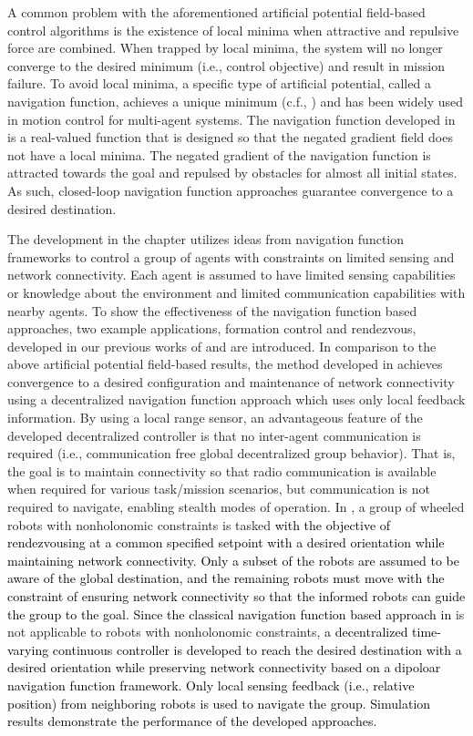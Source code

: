 \documentclass[english]{IOS-Book-Article}
\theoremstyle{definition}
\theoremstyle{definition}
\begin{document}
A common problem with the aforementioned artificial potential field-based
control algorithms is the existence of local minima when attractive
and repulsive force are combined. When trapped by local minima, the
system will no longer converge to the desired minimum (i.e., control
objective) and result in mission failure. To avoid local minima, a
specific type of artificial potential, called a navigation function,
achieves a unique minimum (c.f., \cite{Rimon1992,Rimon_1990}) and
has been widely used in motion control for multi-agent systems. The
navigation function developed in \cite{Rimon_1990} is a real-valued
function that is designed so that the negated gradient field does
not have a local minima. The negated gradient of the navigation function
is attracted towards the goal and repulsed by obstacles for almost
all initial states. As such, closed-loop navigation function approaches
guarantee convergence to a desired destination. 

The development in the chapter utilizes ideas from navigation function
frameworks to control a group of agents with constraints on limited
sensing and network connectivity. Each agent is assumed to have limited
sensing capabilities or knowledge about the environment and limited
communication capabilities with nearby agents. To show the effectiveness
of the navigation function based approaches, two example applications,
formation control and rendezvous, developed in our previous works
of \cite{Kan.Dani.ea2012} and \cite{Kan2012submitted} are introduced.
In comparison to the above artificial potential field-based results,
the method developed in \cite{Kan.Dani.ea2012} achieves convergence
to a desired configuration and maintenance of network connectivity
using a decentralized navigation function approach which uses only
local feedback information. By using a local range sensor, an advantageous
feature of the developed decentralized controller is that no inter-agent
communication is required (i.e., communication free global decentralized
group behavior). That is, the goal is to maintain connectivity so
that radio communication is available when required for various task/mission
scenarios, but communication is not required to navigate, enabling
stealth modes of operation. In \cite{Kan2012submitted}, a group of
wheeled robots with nonholonomic constraints is tasked \textcolor{black}{with
the objective of rendezvousing at a common specified setpoint with
a desired orientation while maintaining network connectivity. Only
a subset of the robots are assumed to be aware of the global destination,
and the remaining robots must move with the constraint of ensuring
network connectivity so that the informed robots can guide the group
to the goal. Since the classical navigation function based approach
in }\cite{Kan2012submitted} is not applicable to robots with nonholonomic
constraints, \textcolor{black}{a decentralized time-varying continuous
controller is developed to reach the desired destination with a desired
orientation while preserving network connectivity based on a dipoloar
navigation function framework. Only local sensing feedback (i.e.,
relative position) from neighboring robots is used to navigate the
group. Simulation results demonstrate the performance of the developed
approaches.}
\end{document}
